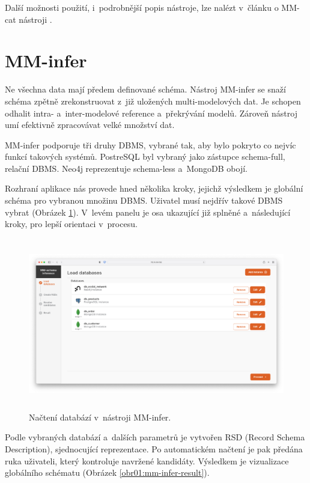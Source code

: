 Další možnosti použití, i~podrobnější popis nástroje, lze nalézt v~článku o MM-cat nástroji \cite{MM_cat}.


\section{MM-infer}

Ne všechna data mají předem definované schéma. Nástroj MM-infer se snaží schéma zpětně zrekonstruovat z~již uložených multi-modelových dat. Je schopen odhalit intra- a~inter-modelové reference a~překrývání modelů. Zároveň nástroj umí efektivně zpracovávat velké množství dat.

MM-infer podporuje tři druhy DBMS, vybrané tak, aby bylo pokryto co nejvíc funkcí takových systémů. PostreSQL byl vybraný jako zástupce schema-full, relační DBMS. Neo4j reprezentuje schema-less a~MongoDB obojí. 

Rozhraní aplikace nás provede hned několika kroky, jejichž výsledkem je globální schéma pro vybranou množinu DBMS. Uživatel musí nejdřív takové DBMS vybrat (Obrázek \ref{obr01:mm-infer-load-database}). V~levém panelu je osa ukazující již splněné a~následující kroky, pro lepší orientaci v~procesu.

\begin{figure}[htb]
  \centering
  \includegraphics[height=75mm]{../img/mm-infer-load-database}
  \caption{Načtení databází v~nástroji MM-infer.}
  \label{obr01:mm-infer-load-database}
\end{figure}

Podle vybraných databází a~dalších parametrů je vytvořen RSD (Record Schema Description), sjednocující reprezentace. Po automatickém načtení je pak předána ruka uživateli, který kontroluje navržené kandidáty. Výsledkem je vizualizace globálního schématu (Obrázek \ref{obr01:mm-infer-result}).

